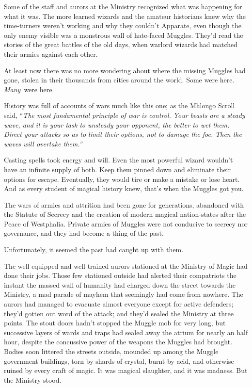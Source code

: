 Some of the staff and aurors at the Ministry recognized what was
happening for what it was. The more learned wizards and the amateur
historians knew why the time-turners weren't working and why they
couldn't Apparate, even though the only enemy visible was a monstrous
wall of hate-faced Muggles. They'd read the stories of the great battles
of the old days, when warlord wizards had matched their armies against
each other.

At least now there was no more wondering about where the missing Muggles
had gone, stolen in their thousands from cities around the world. Some
were here. \emph{Many}~were here.

History was full of accounts of wars much like this one; as the Mhlongo
Scroll said, ``\emph{The most fundamental principle of war is control.
Your beasts are a steady wave, and it is your task to unsteady your
opponent, the better to wet them. Direct your attacks so as to limit
their options, not to damage the foe. Then the waves will overtake
them.''}

Casting spells took energy and will. Even the most powerful wizard
wouldn't have an infinite supply of both. Keep them pinned down and
eliminate their options for escape. Eventually, they would tire or make
a mistake or lose heart. And as every student of magical history knew,
that's when the Muggles got you.

The wars of armies and attrition had been gone for generations,
abandoned with the Statute of Secrecy and the creation of modern magical
nation-states after the Peace of Westphalia. Private armies of Muggles
were not conducive to secrecy nor governance, and they had become a
thing of the past.

Unfortunately, it seemed the past had caught up with them.

The well-equipped and well-trained aurors stationed at the Ministry of
Magic had done their jobs. Those few stationed outside had alerted their
compatriots the instant the massed wall of humanity had charged down the
street towards the Ministry, a mad parade of mayhem that seemingly had
come from nowhere. The aurors had managed to evacuate almost everyone
except for active defenders; they'd gotten out word of the attack; and
they'd sealed the Ministry at three points. The stout doors hadn't
stopped the Muggle mob for very long, but successive layers of wards and
traps had sealed away the atrium for nearly an half hour, despite the
concussive power of the weapons the Muggles had brought. Bodies soon
littered the streets outside, mounded up among the Muggle government
buildings, torn by shards of crystal, burnt by acid, and otherwise
ruined by every craft of magic. It was magical slaughter, and it was
madness. But the Ministry stood.

